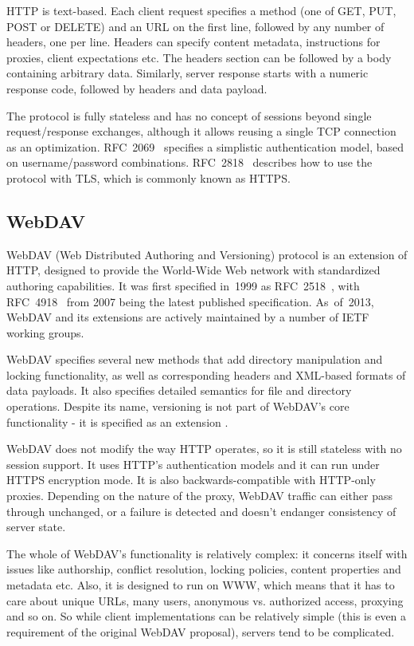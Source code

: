 HTTP is text-based. Each client request specifies a method (one of GET, PUT, POST or DELETE) and an URL on the
first line, followed by any number of headers, one per line.  Headers can specify content metadata,
instructions for proxies, client expectations etc. The headers section can be followed by a body containing
arbitrary data. Similarly, server response starts with a numeric response code, followed by headers and data
payload.

The protocol is fully stateless and has no concept of sessions beyond single request/response exchanges,
although it allows reusing a single TCP connection as an optimization.  RFC~2069~\cite{rfc2069} specifies a
simplistic authentication model, based on username/password combinations. RFC~2818~\cite{rfc2818} describes
how to use the protocol with TLS, which is commonly known as HTTPS.

\subsection{WebDAV}

WebDAV (Web Distributed Authoring and Versioning) protocol is an extension of HTTP, designed to provide the
World-Wide Web network with standardized authoring capabilities. It was first specified in~1999 as
RFC~2518~\cite{rfc2518}, with RFC~4918~\cite{rfc4918} from 2007 being the latest published specification.
As~of~2013, WebDAV and its extensions are actively maintained by a number of IETF working groups.

WebDAV specifies several new methods that add directory manipulation and locking functionality, as well as
corresponding headers and XML-based formats of data payloads. It also specifies detailed semantics for file
and directory operations. Despite its name, versioning is not part of WebDAV's core functionality - it is
specified as an extension \cite{rfc3253}.

WebDAV does not modify the way HTTP operates, so it is still stateless with no session support. It uses HTTP's
authentication models and it can run under HTTPS encryption mode. It is also backwards-compatible with
HTTP-only proxies. Depending on the nature of the proxy, WebDAV traffic can either pass through unchanged, or
a failure is detected and doesn't endanger consistency of server state.

The whole of WebDAV's functionality is relatively complex: it concerns itself with issues like authorship,
conflict resolution, locking policies, content properties and metadata etc. Also, it is designed to run on
WWW, which means that it has to care about unique URLs, many users, anonymous vs. authorized access, proxying
and so on.  So while client implementations can be relatively simple (this is even a requirement of the
original WebDAV proposal), servers tend to be complicated.

